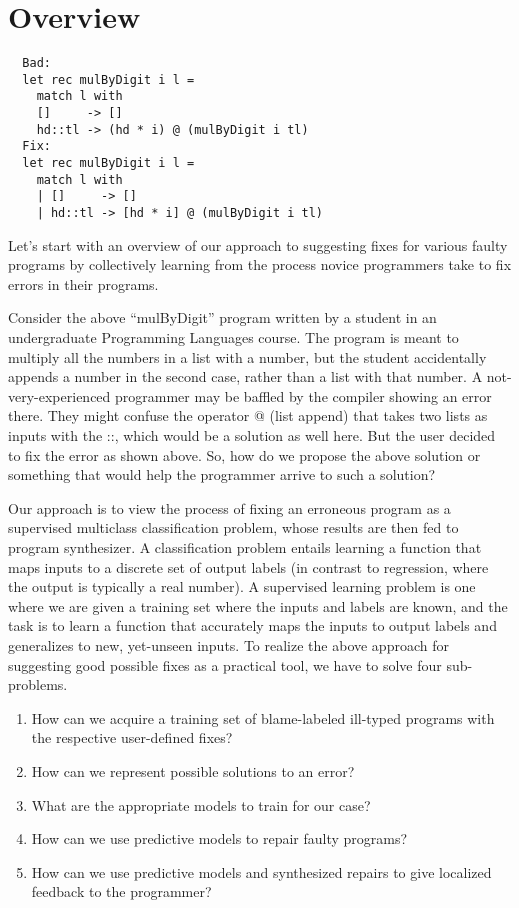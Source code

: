 \section{Overview}
\label{sec:overview}

\begin{verbatim}
  Bad:
  let rec mulByDigit i l =
    match l with
    []     -> []
    hd::tl -> (hd * i) @ (mulByDigit i tl)
  Fix:
  let rec mulByDigit i l =
    match l with
    | []     -> []
    | hd::tl -> [hd * i] @ (mulByDigit i tl)
\end{verbatim}


Let’s start with an overview of our approach to suggesting fixes for various faulty programs by collectively learning from the process novice programmers take to fix errors in their programs.

 Consider the above “mulByDigit” program written by a student in an undergraduate Programming Languages course. The program is meant to multiply all the numbers in a list with a number, but the student accidentally appends a number in the second case, rather than a list with that number. A not-very-experienced programmer may be baffled by the compiler showing an error there. They might confuse the operator @ (list append) that takes two lists as inputs with the ::, which would be a solution as well here. But the user decided to fix the error as shown above. So, how do we propose the above solution or something that would help the programmer arrive to such a solution?

 Our approach is to view the process of fixing an erroneous program as a supervised multiclass classification problem, whose results are then fed to program synthesizer. A classification problem entails learning a function that maps inputs to a discrete set of output labels (in contrast to regression, where the output is typically a real number). A supervised learning problem is one where we are given a training set where the inputs and labels are known, and the task is to learn a function that accurately maps the inputs to output labels and generalizes to new, yet-unseen inputs. To realize the above approach for suggesting good possible fixes as a practical tool, we have to solve four sub-problems.
\begin{enumerate}
  \item How can we acquire a training set of blame-labeled ill-typed programs with the respective user-defined fixes?
  \item How can we represent possible solutions to an error?
  \item What are the appropriate models to train for our case?
  \item How can we use predictive models to repair faulty programs?
  \item How can we use predictive models and synthesized repairs to give localized feedback to the programmer?
\end{enumerate}



